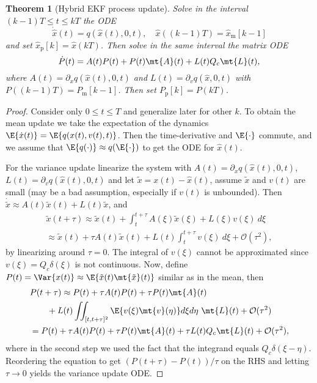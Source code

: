 \documentclass[]{hsrzf}
\theoremstyle{plain}
\newtheorem{thm}{Theorem}[section]
\theoremstyle{definition}
\theoremstyle{remark}
\begin{document}
\begin{thm}[Hybrid EKF process update]
  Solve in the interval $(k-1)T \leq t \leq kT$ the ODE
  \[
    \dot{\hat{x}}(t) = q(\hat{x}(t), 0, t), 
    \quad \hat{x}((k-1)T) = \hat{x}_\mathrm{m}[k-1]
  \]
  and set $\hat{x}_\mathrm{p}[k] = \hat{x}(kT)$. Then solve in the same
  interval the matrix ODE
  \[
    \dot{P}(t) = A(t)P(t) + P(t) \mt{A}(t) + L(t) Q_c \mt{L}(t),
  \]
  where $A(t) = \partial_x q(\hat{x}(t), 0, t)$ and $L(t) = \partial_v
  q(\hat{x}, 0, t)$ with $P((k-1)T) = P_\mathrm{m}[k-1]$. Then set
  $P_\mathrm{p}[k] = P(kT)$.
\end{thm}
\begin{proof}[Proof]
  Consider only $0 \leq t \leq T$ and generalize later for other $k$. To obtain
  the mean update we take the expectation of the dynamics $\E{\dot{x}(t)} =
  \E{q(x(t), v(t), t)}$. Then the time-derivative and $\E{\cdot}$ commute, and
  we assume that $\E{q(\cdot)} \approx q(\E{\cdot})$ to get the ODE for
  $\hat{x}(t)$.

  For the variance update linearize the system with $A(t) = \partial_x
  q(\hat{x}(t), 0, t)$, $L(t) = \partial_v q(\hat{x}(t), 0, t)$ and let
  $\tilde{x} = x(t) - \hat{x}(t)$, assume $\tilde{x}$ and $v(t)$ are small
  (may be a bad assumption, especially if $v(t)$ is unbounded). Then
  $\dot{\tilde{x}} \approx A(t) \tilde{x}(t) + L(t)\tilde{x}$, and
  \begin{gather*}
    \tilde{x}(t + \tau) \approx \tilde{x}(t) + \int_t^{t + \tau}
      A(\xi)\tilde{x}(\xi) + L(\xi) v(\xi) ~ d\xi \\
      \approx \tilde{x}(t) + \tau A(t) \tilde{x}(t) + L(t) \int_t^{t + \tau}
        v(\xi) ~ d\xi + \mathcal{O}(\tau^2),
  \end{gather*}
  by linearizing around $\tau = 0$. The integral of $v(\xi)$ cannot be
  approximated since $v(\xi) = Q_c\delta(\xi)$ is not continuous. Now, define
  $P(t) = \Var{x(t)} \approx \E{\tilde{x}(t) \mt{\tilde{x}}(t)}$ similar as in
  the mean, then
  \begin{align*}
    &P(t + \tau) \approx P(t) + \tau A(t) P(t) + \tau P(t) \mt{A}(t) \\
      &\qquad + L(t) \iint_{[t, t + \tau]^2} \E{v(\xi)\mt{v}(\eta)} d\xi d\eta ~\mt{L}(t)
      + \mathcal{O}(\tau^2) \\
    &= P(t) + \tau A(t) P(t) + \tau P(t) \mt{A}(t)
      + \tau L(t) Q_c \mt{L}(t) + \mathcal{O}(\tau^2),
  \end{align*}
  where in the second step we used the fact that the integrand equals $Q_c
  \delta(\xi - \eta)$. Reordering the equation to get $(P(t + \tau) - P(t)) /
  \tau$ on the RHS and letting $\tau \to 0$ yields the variance update ODE.
\end{proof}
\end{document}
